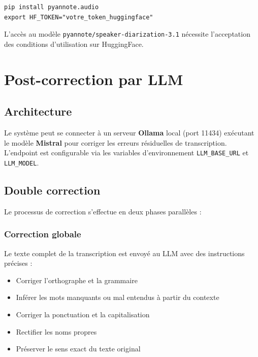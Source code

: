 \documentclass[12pt,a4paper]{report}
\begin{document}
\begin{lstlisting}[style=bash, title=Installation de pyannote.audio]
pip install pyannote.audio
export HF_TOKEN="votre_token_huggingface"
\end{lstlisting}

L'accès au modèle \texttt{pyannote/speaker-diarization-3.1} nécessite l'acceptation des conditions d'utilisation sur HuggingFace.

\chapter{Post-correction par LLM}

\section{Architecture}

Le système peut se connecter à un serveur \textbf{Ollama} local (port 11434) exécutant le modèle \textbf{Mistral} pour corriger les erreurs résiduelles de transcription. L'endpoint est configurable via les variables d'environnement \texttt{LLM\_BASE\_URL} et \texttt{LLM\_MODEL}.

\section{Double correction}

Le processus de correction s'effectue en deux phases parallèles :

\subsection{Correction globale}

Le texte complet de la transcription est envoyé au LLM avec des instructions précises :

\begin{itemize}
    \item Corriger l'orthographe et la grammaire
    \item Inférer les mots manquants ou mal entendus à partir du contexte
    \item Corriger la ponctuation et la capitalisation
    \item Rectifier les noms propres
    \item Préserver le sens exact du texte original
\end{itemize}
\end{document}
